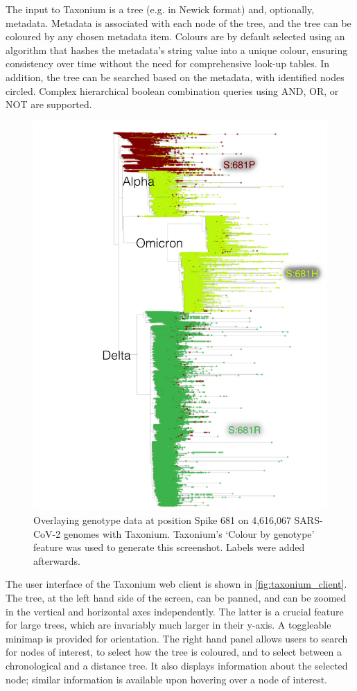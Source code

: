 The input to Taxonium is a tree (e.g. in Newick format) and, optionally, metadata. Metadata is associated with each node of the tree, and the tree can be coloured by any chosen metadata item. Colours are by default selected using an algorithm that hashes the metadata's string value into a unique colour, ensuring consistency over time without the need for comprehensive look-up tables. In addition, the tree can be searched based on the metadata, with identified nodes circled. Complex hierarchical boolean combination queries using AND, OR, or NOT  are supported.

\begin{figure}
\begin{center}
\includegraphics[width=0.9\linewidth]{Figures/681.pdf}
\end{center}
\caption{Overlaying genotype data at position Spike 681 on 4,616,067 SARS-CoV-2 genomes with Taxonium. Taxonium's `Colour by genotype' feature was used to generate this screenshot. Labels were added afterwards.}
\label{fig:681}
\end{figure}

The user interface of the Taxonium web client is shown in \cref{fig:taxonium_client}. The tree, at the left hand side of the screen, can be panned, and can be zoomed in the vertical and horizontal axes independently. The latter is a crucial feature for large trees, which are invariably much larger in their y-axis. A toggleable minimap is provided for orientation. The right hand panel allows users to search for nodes of interest, to select how the tree is coloured, and to select between a chronological and a distance tree. It also displays information about the selected node; similar information is available upon hovering over a node of interest.



